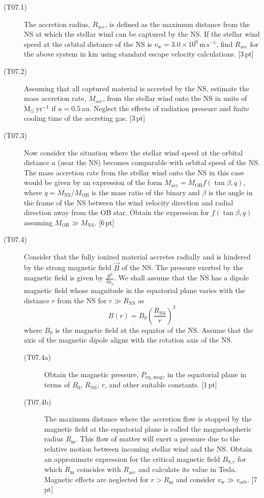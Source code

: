 \begin{description}
\item[(T07.1)] The accretion radius, $R_{\mathrm{acc}}$, is defined as the
  maximum distance from the NS at which the stellar wind can be captured by
  the NS. If the stellar wind speed at the orbital distance of the NS is
  $v_{\mathrm{w}} = 3.0 \times 10^6\,\mathrm{m\,s^{-1}}$, find
  $R_{\mathrm{acc}}$ for the above system in km using standard escape velocity
  calculations. \hfill[3\,pt]
\item[(T07.2)] Assuming that all captured material is accreted by the NS,
  estimate the mass accretion rate, $\dot{M}_{\mathrm{acc}}$, from the stellar
  wind onto the NS in units of $\mathrm{M}_\odot\,\mathrm{yr}^{-1}$ if
  $a = 0.5$\,au. Neglect the effects of radiation pressure and finite cooling
  time of the accreting gas. \hfill[3\,pt]
\item[(T07.3)] Now consider the situation where the stellar wind speed at the
  orbital distance $a$ (near the NS) becomes comparable with orbital speed of
  the NS. The mass accretion rate from the stellar wind onto the NS in this
  case would be given by an expression of the form
  $\dot{M}_{\mathrm{acc}} = \dot{M}_{\mathrm{OB}} f(\tan\beta, q)$, where
  $q = M_{\mathrm{NS}}/M_{\mathrm{OB}}$ is the mass ratio of the binary and
  $\beta$ is the angle in the frame of the NS between the wind velocity
  direction and radial direction away from the OB star. Obtain the expression
  for $f(\tan\beta, q)$ assuming $M_{\mathrm{OB}} \gg M_{\mathrm{NS}}$.
  \hfill[6\,pt]
\item[(T07.4)] Consider that the fully ionized material accretes radially and
  is hindered by the strong magnetic field $\vec{B}$ of the NS. The pressure
  exerted by the magnetic field is given by $\frac{B^2}{2\mu_0}$. We shall
  assume that the NS has a dipole magnetic field whose magnitude in the
  equatorial plane varies with the distance $r$ from the NS for
  $r \gg R_{\mathrm{NS}}$ as
  \[ B(r) = B_0\left(\frac{R_{\mathrm{NS}}}{r}\right)^3 \]
  where $B_0$ is the magnetic field at the equator of the NS. Assume that the
  axis of the magnetic dipole aligns with the rotation axis of the NS.
  \begin{description}
  \item[(T07.4a)] Obtain the magnetic pressure, $P_{\mathrm{eq,\,mag}}$, in
    the equatorial plane in terms of $B_0$, $R_{\mathrm{NS}}$, $r$, and other
    suitable constants. \hfill[1\,pt]
  \item[(T07.4b)] The maximum distance where the accretion flow is stopped by
    the magnetic field at the equatorial plane is called the magnetospheric
    radius $R_{\mathrm{m}}$. This flow of matter will exert a pressure due to
    the relative motion between incoming stellar wind and the NS. Obtain an
    approximate expression for the critical magnetic field $B_{0,\mathrm{c}}$
    for which $R_{\mathrm{m}}$ coincides with $R_{\mathrm{acc}}$ and calculate
    its value in Tesla. Magnetic effects are neglected for
    $r > R_{\mathrm{m}}$ and consider $v_{\mathrm{w}} \gg v_{\mathrm{orb}}$.
    \hfill[7\,pt]
  \end{description}
\end{description}

